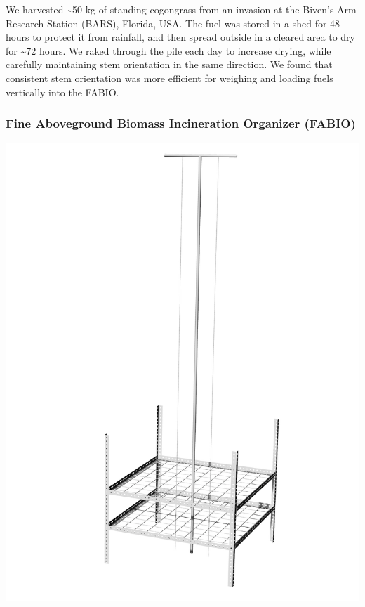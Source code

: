 \documentclass[11pt,a4paper]{article}
\begin{document}
We harvested \textasciitilde{}50 kg of standing cogongrass from an
invasion at the Biven's Arm Research Station (BARS), Florida, USA. The
fuel was stored in a shed for 48-hours to protect it from rainfall, and
then spread outside in a cleared area to dry for \textasciitilde{}72
hours. We raked through the pile each day to increase drying, while
carefully maintaining stem orientation in the same direction. We found
that consistent stem orientation was more efficient for weighing and
loading fuels vertically into the FABIO.

\hypertarget{fine-aboveground-biomass-incineration-organizer-fabio}{%
\subsubsection{Fine Aboveground Biomass Incineration Organizer
(FABIO)}\label{fine-aboveground-biomass-incineration-organizer-fabio}}

\includegraphics{figures/FABIOdraft.jpg}
\end{document}
